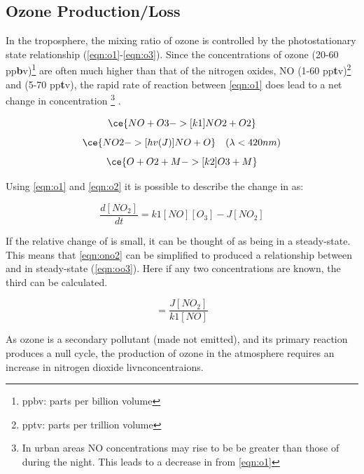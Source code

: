 \subsection{Ozone Production/Loss}\label{sec:o3prod}
In the troposphere, the mixing ratio of ozone is controlled by the photostationary state relationship (\autoref{eqn:o1}-\ref{eqn:o3}).
Since the concentrations of ozone (20-60 pp\textbf{b}v)\footnote{ppbv: parts per billion volume} are often much higher than that of the nitrogen oxides, NO (1-60 pp\textbf{t}v)\footnote{pptv: parts per trillion volume} and  (5-70 pp\textbf{t}v), the rapid rate of reaction between \autoref{eqn:o1} does lead to a net change in  concentration \footnote{In urban areas NO concentrations may rise to be be greater than those of  during the night. This leads to a decrease in from \autoref{eqn:o1}} \citep{fundamentals}.



\begin{equation}
  \centering
\ce{NO + O3 ->[k1] NO2 +O2} \label{eqn:o1}
\end{equation}
\begin{equation}
  \centering
 \ce{NO2 ->[hv (J)] NO + O }\ \ \ (\lambda < 420nm) \label{eqn:o2}
\end{equation}
 \begin{equation}
   \centering
\ce{O + O2 + M ->[k2] O3 + M}\label{eqn:o3}
\end{equation}

Using \autoref{eqn:o1} and \autoref{eqn:o2} it is possible to describe the change in  as:

\begin{equation}
  \frac{d[NO_2]}{dt} = k1[NO][O_3] - J[NO_2]
  \label{eqn:ono2}
\end{equation}

If the relative change of  is small, it can be thought of as being in a steady-state. This means that \autoref{eqn:ono2} can be simplified to produced a relationship between  and  in steady-state (\autoref{eqn:oo3}). Here if any two concentrations are known, the third can be calculated.

\begin{equation}
  [O_3] = \frac{J[NO_2]}{k1[NO]}
  \label{eqn:oo3}
\end{equation}

As ozone is a secondary pollutant (made not emitted), and its primary reaction produces a null cycle, the production of ozone in the atmosphere requires an increase in nitrogen dioxide livnconcentraions.


